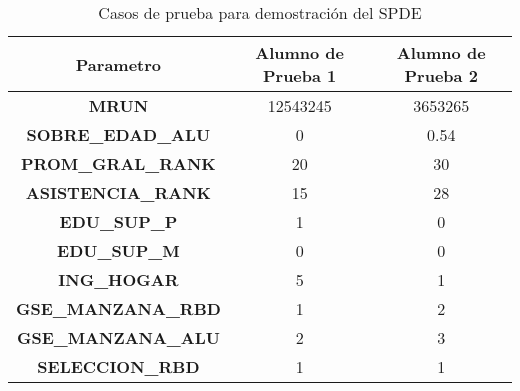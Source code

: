 \begin{table}[H]
\centering
\begin{tabular}{|c|c|c|}
\hline
\textbf{Parametro} & \textbf{Alumno de Prueba 1} & \textbf{Alumno de Prueba 2} \\ \hline
\textbf{MRUN} & 12543245 & 3653265 \\ \hline
\textbf{SOBRE\_EDAD\_ALU} & 0 & 0.54 \\ \hline
\textbf{PROM\_GRAL\_RANK} & 20 & 30 \\ \hline
\textbf{ASISTENCIA\_RANK} & 15 & 28 \\ \hline
\textbf{EDU\_SUP\_P} & 1 & 0 \\ \hline
\textbf{EDU\_SUP\_M} & 0 & 0 \\ \hline
\textbf{ING\_HOGAR} & 5 & 1 \\ \hline
\textbf{GSE\_MANZANA\_RBD} & 1 & 2 \\ \hline
\textbf{GSE\_MANZANA\_ALU} & 2 & 3 \\ \hline
\textbf{SELECCION\_RBD} & 1 & 1 \\ \hline
\end{tabular}
\caption{Casos de prueba para demostración del SPDE}
\label{tab:test-spde}
\end{table}